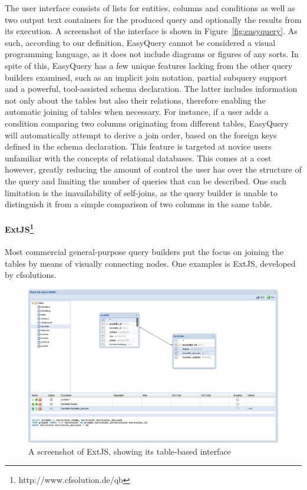 \documentclass[11pt,a4paper]{globis-book}
\begin{document}
The user interface consists of lists for entities, columns and conditions as well as two output text containers for the produced query and optionally the results from its execution. A screenshot of the interface is shown in Figure~\ref{fig:easyquery}. As such, according to our definition, EasyQuery cannot be considered a visual programming language, as it does not include diagrams or figures of any sorts. In spite of this, EasyQuery has a few unique features lacking from the other query builders examined, such as an implicit join notation, partial subquery support and a powerful, tool-assisted schema declaration. The latter includes information not only about the tables but also their relations, therefore enabling the automatic joining of tables when necessary. For instance, if a user adds a condition comparing two columns originating from different tables, EasyQuery will automatically attempt to derive a join order, based on the foreign keys defined in the schema declaration. This feature is targeted at novice users unfamiliar with the concepts of relational databases. This comes at a cost however, greatly reducing the amount of control the user has over the structure of the query and limiting the number of queries that can be described. One such limitation is the inavailability of self-joins, as the query builder is unable to distinguish it from a simple comparison of two columns in the same table.

\paragraph*{ExtJS\footnote{http://www.cfsolution.de/qb}}
Most commercial general-purpose query builders put the focus on joining the tables by means of visually connecting nodes. One examples is ExtJS, developed by cfsolutions.

\begin{figure}[h]
  \centering
  \includegraphics[width=\textwidth]{resources/ExtJS.png}
  \caption{A screenshot of ExtJS, showing its table-based interface}
  \label{fig:extjs}
\end{figure}
\end{document}
